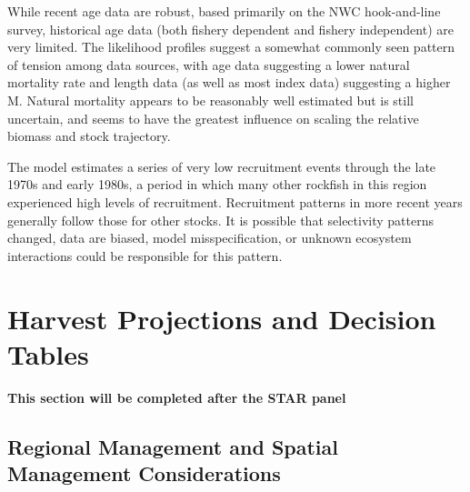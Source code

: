 \documentclass[11pt,
  english,
  a4paper,
]{article}
\begin{document}
While recent age data are robust, based primarily on the NWC hook-and-line survey, historical age data (both fishery dependent and fishery independent) are very limited. The likelihood profiles suggest a somewhat commonly seen pattern of tension among data sources, with age data suggesting a lower natural mortality rate and length data (as well as most index data) suggesting a higher M. Natural mortality appears to be reasonably well estimated but is still uncertain, and seems to have the greatest influence on scaling the relative biomass and stock trajectory.

The model estimates a series of very low recruitment events through the late 1970s and early 1980s, a period in which many other rockfish in this region experienced high levels of recruitment. Recruitment patterns in more recent years generally follow those for other stocks. It is possible that selectivity patterns changed, data are biased, model misspecification, or unknown ecosystem interactions could be responsible for this pattern.


\hypertarget{harvest-projections-and-decision-tables}{%
\section{Harvest Projections and Decision Tables}\label{harvest-projections-and-decision-tables}}

\leavevmode\tagmcend\tagstructend

\textbf{This section will be completed after the STAR panel}


\hypertarget{regional-management-and-spatial-management-considerations}{%
\subsection{Regional Management and Spatial Management Considerations}\label{regional-management-and-spatial-management-considerations}}

\leavevmode\tagmcend\tagstructend
\end{document}
